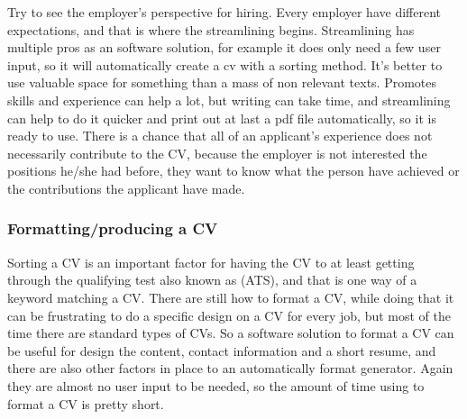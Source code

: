 Try to see the employer's perspective for hiring. Every employer have different expectations, 
and that is where the streamlining begins. Streamlining has multiple pros as an software solution,
for example it does only need a few user input, so it will automatically create a cv with a sorting method. 
It's better to use valuable space for something than a mass of non relevant texts.
Promotes skills and experience can help a lot, but writing can take time, and streamlining can help to do it quicker 
and print out at last a pdf file automatically, so it is ready to use.
There is a chance that all of an applicant's experience does not necessarily contribute to the CV, 
because the employer is not interested the positions he/she had before, they want to know what the person have achieved
or the contributions the applicant have made. 


\subsubsection{Formatting/producing a CV} {
Sorting a CV is an important factor for having the CV to at least getting through the qualifying test also known as (ATS),
and that is one way of a keyword matching a CV. There are still how to format a CV, 
while doing that it can be frustrating to do a specific design on a CV for every job, 
but most of the time there are standard types of CVs.
So a software solution to format a CV can be useful for design the content, contact information and a short resume,
and there are also other factors in place to an automatically format generator. Again they are almost no user input to be needed, 
so the amount of time using to format a CV is pretty short. 

}